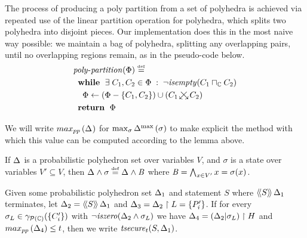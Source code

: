 The process of producing a poly partition
from a set of polyhedra is achieved via repeated use of the linear
partition operation for polyhedra, which splits two polyhedra into
disjoint pieces. Our implementation does this in the most naive way
possible: we maintain a bag of polyhedra, splitting any overlapping
pairs, until no overlapping regions remain, as in the pseudo-code
below.
\begin{align*}
& \var{poly}\text{-}\var{partition}(\Phi) \defeq \\
& \;\; \awhile \; \exists \; \pa, \pb \in \Phi \given \neg \isempty{\pa \pmeet
   \pb} \\
& \;\;\;\; \Phi \leftarrow \paren{\Phi-\set{\pa,\pb}} \cup
  \paren{\partn{\pa}{\pb}} \\
& \;\; \areturn \; \Phi
\end{align*}

We will write $ \ppsmax{\pps{}} $ for $
\max_{\sigma}\ppsprob{\pps{}}{\sigma} $ to make explicit the method
with which this value can be computed according to the lemma above.

\begin{notation} If $ \pps{} $ is a probabilistic polyhedron set over
  variables $ V $, and $ \sigma $ is a state over variables $ V'
  \subseteq V $, then $ \absdcond{\pps{}}{\sigma} \defeq
  \absdcond{\pps{}}{\bexp} $ where $ \bexp = \bigwedge_{x \in V'} x =
  \sigma(x) $.
\end{notation}

%

\begin{definition}
Given some probabilistic polyhedron set $\pps{1}$ and statement $ S $ where
$ \abspevalp{S}{\pps{1}} $ terminates, let $\pps{2} =
\abspevalp{S}{\pps{1}}$ and $\pps{3} = \project{\pps{2}}{L} =
\set{\pp{i}'}$. If for every $ \sigma_L \in \psconc{\set{\poly_{i}'}} $
with $ \neg\iszero{\absdcond{\pps{2}}{\sigma_L}} $ we have $ \pps{4} =
\project{\paren{\absdrevise{\pps{2}}{\sigma_L}}}{H} $ and
$ \ppsmax{\pps{4}} \leq t $, then we write
$\abspolicy{S}{\pps{1}}{t}$.
\end{definition}

